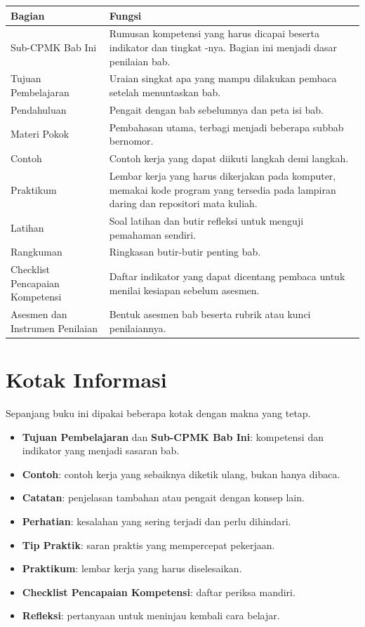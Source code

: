 \begin{center}
\begin{tabularx}{\textwidth}{@{}L{4.3cm} Y@{}}
\toprule
\headrow \textbf{Bagian} & \textbf{Fungsi} \\
\midrule
Sub-CPMK Bab Ini &
Rumusan kompetensi yang harus dicapai beserta indikator dan tingkat
-nya. Bagian ini menjadi dasar penilaian bab. \\
\addlinespace
Tujuan Pembelajaran &
Uraian singkat apa yang mampu dilakukan pembaca setelah menuntaskan bab. \\
\addlinespace
Pendahuluan &
Pengait dengan bab sebelumnya dan peta isi bab. \\
\addlinespace
Materi Pokok &
Pembahasan utama, terbagi menjadi beberapa subbab bernomor. \\
\addlinespace
Contoh &
Contoh kerja yang dapat diikuti langkah demi langkah. \\
\addlinespace
Praktikum &
Lembar kerja yang harus dikerjakan pada komputer, memakai kode program
yang tersedia pada lampiran daring dan repositori mata kuliah. \\
\addlinespace
Latihan &
Soal latihan dan butir refleksi untuk menguji pemahaman sendiri. \\
\addlinespace
Rangkuman &
Ringkasan butir-butir penting bab. \\
\addlinespace
Checklist Pencapaian Kompetensi &
Daftar indikator yang dapat dicentang pembaca untuk menilai kesiapan
sebelum asesmen. \\
\addlinespace
Asesmen dan Instrumen Penilaian &
Bentuk asesmen bab beserta rubrik atau kunci penilaiannya. \\
\bottomrule
\end{tabularx}
\end{center}

\section*{Kotak Informasi}

Sepanjang buku ini dipakai beberapa kotak dengan makna yang tetap.

\begin{itemize}
  \item \textbf{Tujuan Pembelajaran} dan \textbf{Sub-CPMK Bab Ini}:
        kompetensi dan indikator yang menjadi sasaran bab.
  \item \textbf{Contoh}: contoh kerja yang sebaiknya diketik ulang, bukan
        hanya dibaca.
  \item \textbf{Catatan}: penjelasan tambahan atau pengait dengan konsep
        lain.
  \item \textbf{Perhatian}: kesalahan yang sering terjadi dan perlu
        dihindari.
  \item \textbf{Tip Praktik}: saran praktis yang mempercepat pekerjaan.
  \item \textbf{Praktikum}: lembar kerja yang harus diselesaikan.
  \item \textbf{Checklist Pencapaian Kompetensi}: daftar periksa mandiri.
  \item \textbf{Refleksi}: pertanyaan untuk meninjau kembali cara belajar.
\end{itemize}

